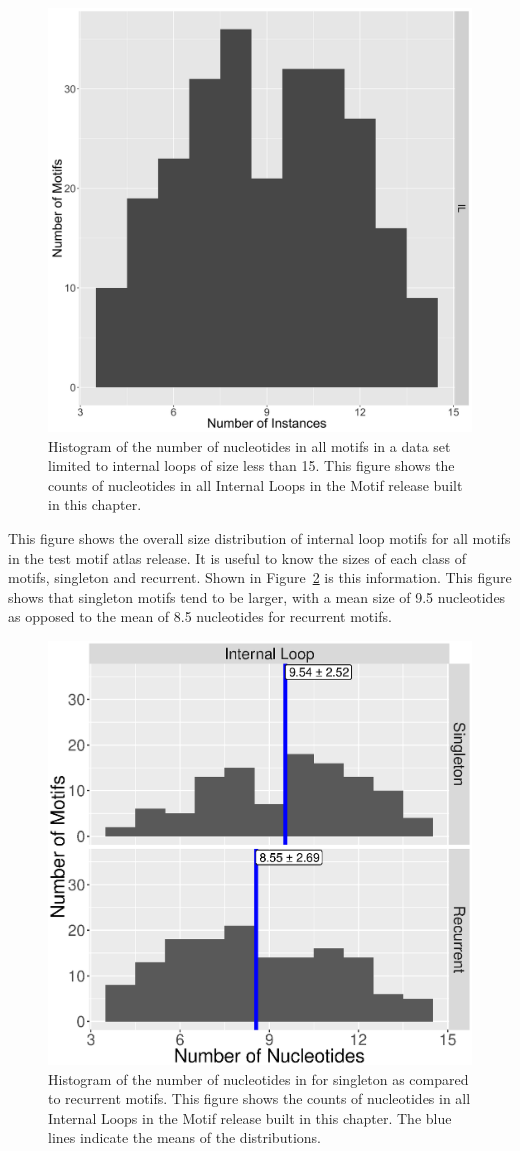 \begin{figure}
  \includegraphics[width=0.5\linewidth]{chapter-5/figs/motifs/nucleotides}
  \caption{Histogram of the number of nucleotides in all motifs in a data set
  limited to internal loops of size less than 15. This figure shows the counts
  of nucleotides in all Internal Loops in the Motif release built in this
  chapter.}
  \label{fig:num-motif-nucleotides}
\end{figure}

This figure shows the overall size distribution of internal loop motifs for all
motifs in the test motif atlas release. It is useful to know the sizes of each
class of motifs, singleton and recurrent. Shown in
Figure~\ref{fig:num-nt-by-class} is this information. This figure shows that
singleton motifs tend to be larger, with a mean size of 9.5 nucleotides as
opposed to the mean of 8.5 nucleotides for recurrent motifs.


\begin{figure}
  \includegraphics[width=0.5\linewidth]{chapter-5/figs/motifs/nucleotides-by-type}
  \caption{Histogram of the number of nucleotides in for singleton as compared
  to recurrent motifs. This figure shows the counts of nucleotides in all
  Internal Loops in the Motif release built in this chapter. The blue lines
  indicate the means of the distributions.}
  \label{fig:num-nt-by-class}
\end{figure}

